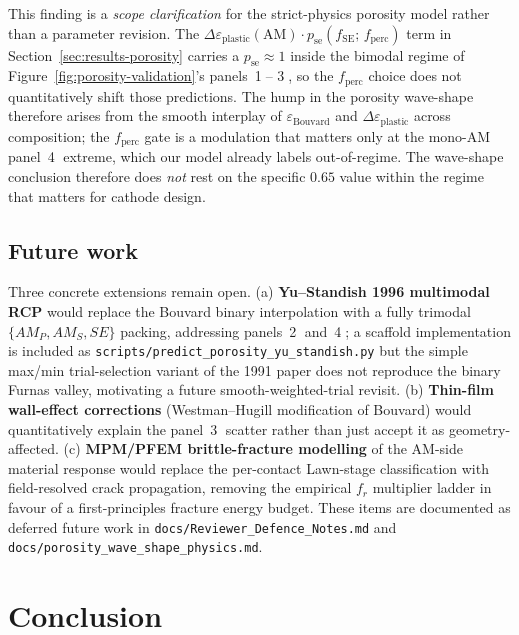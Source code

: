 \documentclass[11pt, a4paper]{article}
\begin{document}
This finding is a \emph{scope clarification} for the strict-physics
porosity model rather than a parameter revision.  The
$\Delta\varepsilon_{\mathrm{plastic}}(\mathrm{AM}) \cdot
p_{\mathrm{se}}(f_{\mathrm{SE}};\,f_{\mathrm{perc}})$ term in
Section~\ref{sec:results-porosity} carries a $p_{\mathrm{se}}
\approx 1$ inside the bimodal regime of
Figure~\ref{fig:porosity-validation}'s panels~\textcircled{1}--%
\textcircled{3}, so the $f_{\mathrm{perc}}$ choice does not
quantitatively shift those predictions.  The hump in the
porosity wave-shape therefore arises from the smooth interplay of
$\varepsilon_{\mathrm{Bouvard}}$ and $\Delta\varepsilon_{\mathrm
{plastic}}$ across composition; the $f_{\mathrm{perc}}$ gate is a
modulation that matters only at the mono-AM panel~\textcircled{4}
extreme, which our model already labels out-of-regime.  The
wave-shape conclusion therefore does \emph{not} rest on the
specific $0.65$ value within the regime that matters for cathode
design.

\subsection{Future work}
\label{sec:future}
Three concrete extensions remain open. (a) \textbf{Yu--Standish
1996 multimodal RCP} would replace the Bouvard binary
interpolation with a fully trimodal $\{AM_P, AM_S, SE\}$ packing,
addressing panels~\textcircled{2} and~\textcircled{4}; a scaffold
implementation is included as
\texttt{scripts/predict\_porosity\_yu\_standish.py} but the simple
max/min trial-selection variant of the 1991 paper does not
reproduce the binary Furnas valley, motivating a future
smooth-weighted-trial revisit. (b) \textbf{Thin-film wall-effect
corrections} (Westman--Hugill modification of Bouvard) would
quantitatively explain the panel~\textcircled{3} scatter rather
than just accept it as geometry-affected. (c) \textbf{MPM/PFEM
brittle-fracture modelling} of the AM-side material response
would replace the per-contact Lawn-stage classification with
field-resolved crack propagation, removing the empirical
$f_r$ multiplier ladder in favour of a first-principles fracture
energy budget. These items are documented as deferred future
work in
\texttt{docs/Reviewer\_Defence\_Notes.md} and
\texttt{docs/porosity\_wave\_shape\_physics.md}.

\section{Conclusion}
\label{sec:conclusion}
\end{document}
